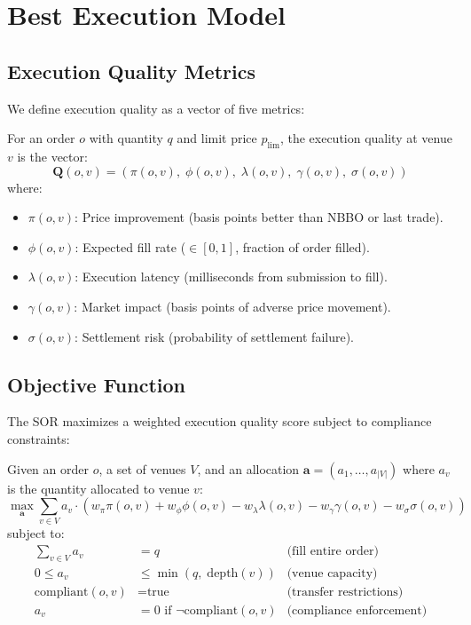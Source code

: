 \section{Best Execution Model}
\label{sec:model}

\subsection{Execution Quality Metrics}

We define execution quality as a vector of five metrics:

\begin{definition}
For an order $o$ with quantity $q$ and limit price $p_{\text{lim}}$, the execution quality at venue $v$ is the vector:
\[
\mathbf{Q}(o, v) = \left( \pi(o,v),\; \phi(o,v),\; \lambda(o,v),\; \gamma(o,v),\; \sigma(o,v) \right)
\]
where:
\begin{itemize}[nosep]
  \item $\pi(o,v)$: Price improvement (basis points better than NBBO or last trade).
  \item $\phi(o,v)$: Expected fill rate ($\in [0, 1]$, fraction of order filled).
  \item $\lambda(o,v)$: Execution latency (milliseconds from submission to fill).
  \item $\gamma(o,v)$: Market impact (basis points of adverse price movement).
  \item $\sigma(o,v)$: Settlement risk (probability of settlement failure).
\end{itemize}
\end{definition}

\subsection{Objective Function}

The SOR maximizes a weighted execution quality score subject to compliance constraints:

\begin{definition}
Given an order $o$, a set of venues $V$, and an allocation $\mathbf{a} = (a_1, \ldots, a_{|V|})$ where $a_v$ is the quantity allocated to venue $v$:
\[
\max_{\mathbf{a}} \sum_{v \in V} a_v \cdot \left( w_\pi \pi(o,v) + w_\phi \phi(o,v) - w_\lambda \lambda(o,v) - w_\gamma \gamma(o,v) - w_\sigma \sigma(o,v) \right)
\]
subject to:
\begin{align}
\sum_{v \in V} a_v &= q & \text{(fill entire order)} \\
0 \leq a_v &\leq \min(q,\; \text{depth}(v)) & \text{(venue capacity)} \\
\text{compliant}(o, v) &= \text{true} & \text{(transfer restrictions)} \\
a_v &= 0 \text{ if } \lnot\text{compliant}(o, v) & \text{(compliance enforcement)}
\end{align}
\end{definition}

